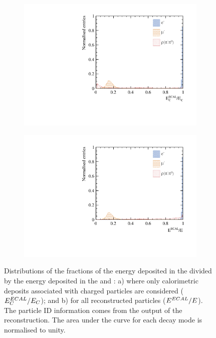 \begin{figure}[htbp]
\centering
\begin{subfigure}[b]{0.45\textwidth}
 \includegraphics[width=\textwidth]{tau/var3/EEHCalRatio_100GeV_improved}
  \caption{}
  \label{fig:tauVarEEcalRatio}
\end{subfigure}
\begin{subfigure}[b]{0.45\textwidth}
 \includegraphics[width=\textwidth]{tau/var3/EEHCalAllRatio_100GeV_improved}
  \caption{}
  \label{fig:tauVarEEcalRatioAll}
\end{subfigure}
\caption
{Distributions of  the fractions of the energy  deposited in the \ECAL divided by the  energy deposited in the \ECAL and \HCAL: a) where only calorimetric deposits associated with charged particles are considered ($E^{ECAL}_{C} / E_{C}$); and b) for all reconstructed particles ($ E^{ECAL} / E$). The particle ID information comes from the output of the \pandora reconstruction. The area under the curve for each decay mode is normalised to unity.}
\label{fig:tauVar4}
\end{figure}

